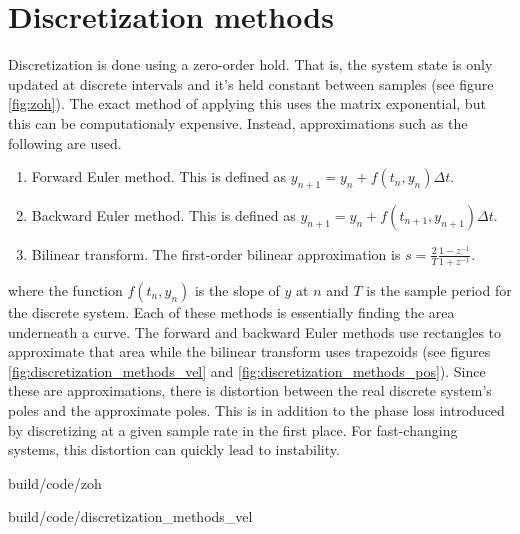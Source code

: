 \section{Discretization methods}

Discretization is done using a zero-order hold. That is, the system state is
only updated at discrete intervals and it's held constant between samples (see
figure \ref{fig:zoh}). The exact method of applying this uses the matrix
exponential, but this can be computationaly expensive. Instead, approximations
such as the following are used.

\begin{enumerate}
  \item Forward Euler method. This is defined as
    $y_{n+1} = y_n + f(t_n, y_n) \Delta t$.
  \item Backward Euler method. This is defined as
    $y_{n+1} = y_n + f(t_{n+1}, y_{n+1}) \Delta t$.
  \item Bilinear transform. The first-order bilinear approximation is
    $s = \frac{2}{T} \frac{1 - z^{-1}}{1 + z^{-1}}$.
\end{enumerate}

where the function $f(t_n, y_n)$ is the slope of $y$ at $n$ and $T$ is the
sample period for the discrete system. Each of these methods is essentially
finding the area underneath a curve. The forward and backward Euler methods use
rectangles to approximate that area while the bilinear transform uses
trapezoids (see figures \ref{fig:discretization_methods_vel} and
\ref{fig:discretization_methods_pos}). Since these are approximations, there is
distortion between the real discrete system's poles and the approximate poles.
This is in addition to the phase loss introduced by discretizing at a given
sample rate in the first place. For fast-changing systems, this distortion can
quickly lead to instability.

\begin{svg}{build/code/zoh}
    \caption{Zero-order hold of a system response}
    \label{fig:zoh}
\end{svg}

\begin{svg}{build/code/discretization_methods_vel}
  \caption{Discretization methods applied to velocity data}
  \label{fig:discretization_methods_vel}
\end{svg}

